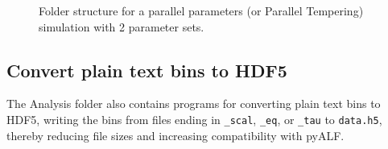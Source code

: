 \begin{figure}
\caption{Folder structure for a parallel parameters (or Parallel Tempering) simulation with 2 parameter sets.}\label{fig:parallel_params}
\end{figure}


%
\subsection{Convert plain text bins to HDF5} \label{sec:convert_to_hdf5}
%
The Analysis folder also contains programs for converting plain text bins to HDF5, writing the bins from files ending in \verb|_scal|, \verb|_eq|, or \verb|_tau| to \verb|data.h5|, thereby reducing file sizes and increasing compatibility with pyALF.

